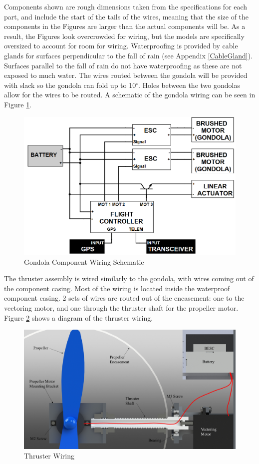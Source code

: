\documentclass[../main.tex]{subfiles}
\begin{document}
Components shown are rough dimensions taken from the specifications for each part, and include the start of the tails of the wires, meaning that the size of the components in the Figures are larger than the actual components will be. As a result, the Figures look overcrowded for wiring, but the models are specifically oversized to account for room for wiring. Waterproofing is provided by cable glands for surfaces perpendicular to the fall of rain (see Appendix \ref{CableGland}). Surfaces parallel to the fall of rain do not have waterproofing as these are not exposed to much water. The wires routed between the gondola will be provided with slack so the gondola can fold up to 10$^{\circ}$. Holes between the two gondolas allow for the wires to be routed. A schematic of the gondola wiring can be seen in Figure \ref{fig:gondolaWiringSchematic}.

\begin{figure}[H]
	\centering
	\includegraphics[width=.8\linewidth]{img/design/gondola/gondolaWiringSchematic.png}
	\caption{Gondola Component Wiring Schematic}
	\label{fig:gondolaWiringSchematic}
\end{figure}

The thruster assembly is wired similarly to the gondola, with wires coming out of the component casing. Most of the wiring is located inside the waterproof component casing. 2 sets of wires are routed out of the encasement: one to the vectoring motor, and one through the thruster shaft for the propeller motor. Figure \ref{fig:thrusterWiring} shows a diagram of the thruster wiring.

\begin{figure}[H]
	\centering
	\includegraphics[width=.8\linewidth]{img/design/thruster/thrusterWiring.png}
	\caption{Thruster Wiring}
	\label{fig:thrusterWiring}
\end{figure}
\end{document}

